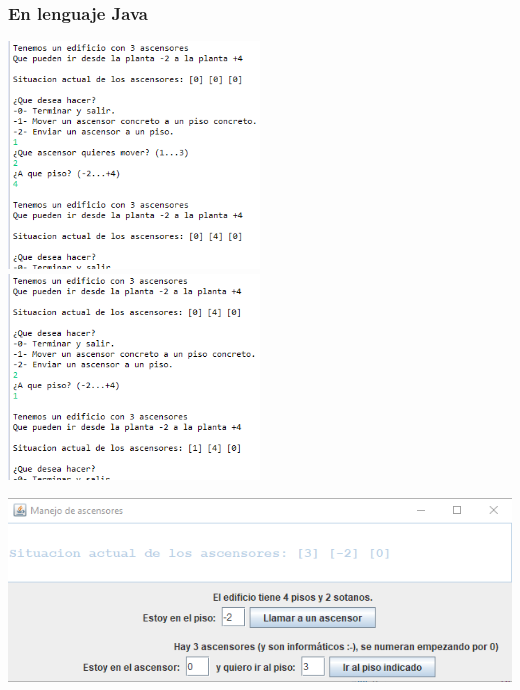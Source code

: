 \documentclass[spanish,12pt,a4paper,final,oneside]{book}
\begin{document}
\subsubsection*{En lenguaje Java} \lstset{language=Java} 





\includegraphics[width=0.5\textwidth]{ascensores - pantallazo - textual1} 
\includegraphics[width=0.5\textwidth]{ascensores - pantallazo - textual2} 

\includegraphics[width=\textwidth]{ascensores - pantallazo - grafico1} 


\end{document}
